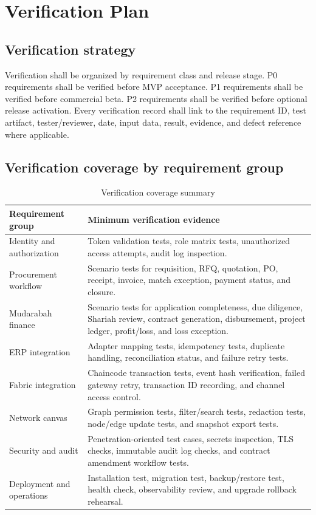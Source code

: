 \documentclass[11pt,a4paper]{article}
\begin{document}
\section{Verification Plan}

\subsection{Verification strategy}
Verification shall be organized by requirement class and release stage. P0 requirements shall be verified before MVP acceptance. P1 requirements shall be verified before commercial beta. P2 requirements shall be verified before optional release activation. Every verification record shall link to the requirement ID, test artifact, tester/reviewer, date, input data, result, evidence, and defect reference where applicable.

\subsection{Verification coverage by requirement group}
\begin{table}[h]
\centering
\begin{tabularx}{\textwidth}{@{}p{}X@{}}
\toprule
Requirement group & Minimum verification evidence \\
\midrule
Identity and authorization & Token validation tests, role matrix tests, unauthorized access attempts, audit log inspection. \\
Procurement workflow & Scenario tests for requisition, RFQ, quotation, PO, receipt, invoice, match exception, payment status, and closure. \\
Mudarabah finance & Scenario tests for application completeness, due diligence, Shariah review, contract generation, disbursement, project ledger, profit/loss, and loss exception. \\
ERP integration & Adapter mapping tests, idempotency tests, duplicate handling, reconciliation status, and failure retry tests. \\
Fabric integration & Chaincode transaction tests, event hash verification, failed gateway retry, transaction ID recording, and channel access control. \\
Network canvas & Graph permission tests, filter/search tests, redaction tests, node/edge update tests, and snapshot export tests. \\
Security and audit & Penetration-oriented test cases, secrets inspection, TLS checks, immutable audit log checks, and contract amendment workflow tests. \\
Deployment and operations & Installation test, migration test, backup/restore test, health check, observability review, and upgrade rollback rehearsal. \\
\bottomrule
\end{tabularx}
\caption{Verification coverage summary}
\end{table}
\end{document}
